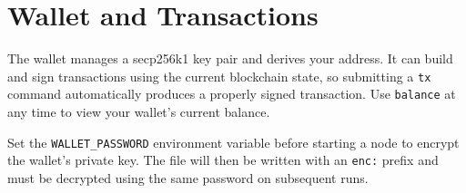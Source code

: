 \chapter{Wallet and Transactions}
The wallet manages a secp256k1 key pair and derives your address. It can build and sign transactions using the current blockchain state, so submitting a \texttt{tx} command automatically produces a properly signed transaction. Use \texttt{balance} at any time to view your wallet's current balance.

Set the \texttt{WALLET_PASSWORD} environment variable before starting a node to encrypt the wallet's private key. The file will then be written with an \texttt{enc:} prefix and must be decrypted using the same password on subsequent runs.
